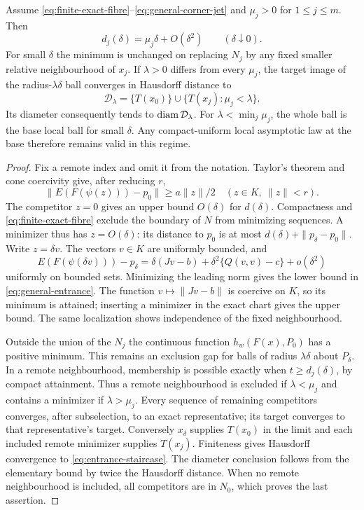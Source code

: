 \begin{theorem}\label{thm:remote-general}
Assume \eqref{eq:finite-exact-fibre}--\eqref{eq:general-corner-jet} and
$\mu_j>0$ for $1\le j\le m$. Then
\begin{equation}\label{eq:general-entrance}
 d_j(\delta)=\mu_j\delta+O(\delta^2)\qquad(\delta\downarrow0).
\end{equation}
For small $\delta$ the minimum is unchanged on replacing $N_j$ by any
fixed smaller relative neighbourhood of $x_j$. If $\lambda>0$ differs
from every $\mu_j$, the target image of the radius-$\lambda\delta$ ball
converges in Hausdorff distance to
\begin{equation}\label{eq:entrance-staircase}
 \mathcal D_\lambda=\{T(x_0)\}\cup
                 \{T(x_j):\mu_j<\lambda\}.
\end{equation}
Its diameter consequently tends to $\operatorname{diam}\mathcal D_\lambda$.
For $\lambda<\min_j\mu_j$, the whole ball is the base local ball for
small $\delta$. Any compact-uniform local asymptotic law at the base
therefore remains valid in this regime.
\end{theorem}
\begin{proof}
Fix a remote index and omit it from the notation. Taylor's theorem and
cone coercivity give, after reducing $r$,
\[
 \|E(F(\psi(z)))-p_0\|\ge a\|z\|/2\quad(z\in K,\ \|z\|<r).
\]
The competitor $z=0$ gives an upper bound $O(\delta)$ for $d(\delta)$.
Compactness and \eqref{eq:finite-exact-fibre} exclude the boundary of
$N$ from minimizing sequences. A minimizer thus has $z=O(\delta)$:
its distance to $p_0$ is at most $d(\delta)+\|p_\delta-p_0\|$.
Write $z=\delta v$. The vectors $v\in K$ are uniformly bounded, and
\[
 E(F(\psi(\delta v)))-p_\delta
   =\delta(Jv-b)+\delta^2\{Q(v,v)-c\}+o(\delta^2)
\]
uniformly on bounded sets. Minimizing the leading norm gives the lower
bound in \eqref{eq:general-entrance}. The function $v\mapsto\|Jv-b\|$
is coercive on $K$, so its minimum is attained; inserting a minimizer
in the exact chart gives the upper bound. The same localization shows
independence of the fixed neighbourhood.

Outside the union of the $N_j$ the continuous function
$h_w(F(x),P_0)$ has a positive minimum. This remains an exclusion gap
for balls of radius $\lambda\delta$ about $P_\delta$. In a remote
neighbourhood, membership is possible exactly when
$t\ge d_j(\delta)$, by compact attainment. Thus a remote neighbourhood
is excluded if $\lambda<\mu_j$ and contains a minimizer if
$\lambda>\mu_j$. Every sequence of remaining competitors converges,
after subselection, to an exact representative; its target converges to
that representative's target. Conversely $x_\delta$ supplies $T(x_0)$
in the limit and each included remote minimizer supplies $T(x_j)$.
Finiteness gives Hausdorff convergence to \eqref{eq:entrance-staircase}.
The diameter conclusion follows from the elementary bound by twice the
Hausdorff distance. When no remote neighbourhood is included, all
competitors are in $N_0$, which proves the last assertion.
\end{proof}


